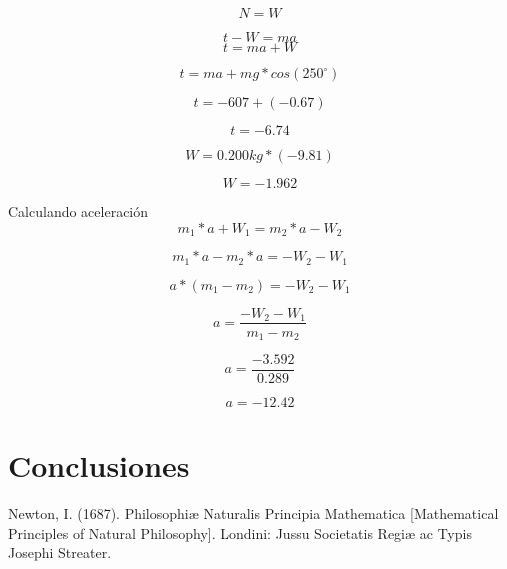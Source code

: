 \documentclass{article}
\begin{document}
\begin{multicols}{2}

\begin{equation*}
	N = W 
\end{equation*}


\begin{equation*}
	t - W = ma	
\end{equation*}
\begin{equation*}
	t = ma + W
\end{equation*}

\begin{equation*}
t = ma + mg * cos(250^\circ)
\end{equation*}

\begin{equation*}
t = -607 + (-0.67)
\end{equation*}

\begin{equation*}
t= -6.74
\end{equation*}

\begin{equation*}
W = 0.200kg * (-9.81)
\end{equation*}

\begin{equation*}
W = -1.962 
\end{equation*}

Calculando aceleración
\begin{equation*}
	m_1 * a + W_1 = m_2 * a - W_2
\end{equation*}

\begin{equation*}
	m_1 * a - m_2 * a = -W_2 - W_1
\end{equation*}

\begin{equation*}
	a * (m_1 - m_2) = -W_2 - W_1
\end{equation*}

\begin{equation*}
	a = \frac{-W_2 - W_1}{m_1 - m_2}
\end{equation*}

\begin{equation*}
a = \frac{-3.592}{0.289}
\end{equation*}

\begin{equation*}
	a = -12.42
\end{equation*}




\section{Conclusiones}\label{Conclusiones}				%

\begin{thebibliography}{9}						%

	Newton, I. (1687). Philosophiæ Naturalis Principia Mathematica [Mathematical Principles of Natural Philosophy]. Londini: Jussu Societatis Regiæ ac Typis Josephi Streater.
\end{thebibliography}
\end{multicols}
\end{document}
